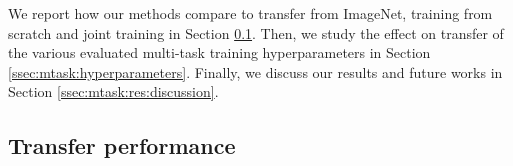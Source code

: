 
We report how our methods compare to transfer from ImageNet, training from scratch and joint training in Section \ref{ssec:mtask:transfer_perfromance}. Then, we study the effect on transfer of the various evaluated multi-task training hyperparameters in Section \ref{ssec:mtask:hyperparameters}. Finally, we discuss our results and future works in Section \ref{ssec:mtask:res:discussion}.

\subsection{Transfer performance}
\label{ssec:mtask:transfer_perfromance}



